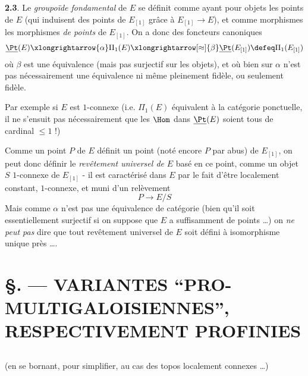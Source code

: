 {\bf 2.3}. Le \emph{groupoïde fondamental} de $E$ se définit comme ayant pour objets les points de $E$ (qui induisent des points de $E_{[1]}$ grâce à $E_{[1]} \to E$), et comme morphismes les morphismes \emph{de points} de $E_{[1]}$. On a donc des foncteurs canoniques
$$
\underline{\Pt}(E) \xlongrightarrow{\alpha} \Pi_1(E) \xlongrightarrow[\approx]{\beta} \underline{\Pt}(E_{[1]}) \defeq \Pi_1(E_{[1]})
$$
où $\beta$ est une équivalence (mais pas surjectif sur les objets), et où bien sur $\alpha$ n'est pas 
nécessairement une équivalence ni même pleinement fidèle, ou seulement fidèle.

Par exemple si $E$ est $1$-connexe (i.e. $\Pi_1(E)$ équivalent à la catégorie ponctuelle, il ne s'ensuit 
pas nécessairement que les $\Hom$ dans $\underline{\Pt}(E)$ soient tous de cardinal $\leq 1$ !)

Comme un point $P$ de $E$ définit un point (noté encore $P$ par abus) de $E_{[1]}$, on peut donc définir 
le \emph{revêtement universel de} $E$ basé en ce point, comme un objet $S$ $1$-connexe de $E_{[1]}$ - il 
est caractérisé dans $E$ par le fait d'être localement constant, $1$-connexe, et muni d'un relèvement
$$
P \to E/S
$$
Mais comme $\alpha$ n'est pas une équivalence de catégorie (bien qu'il soit essentiellement surjectif si 
on suppose que $E$ a suffisamment de points \dots) on \emph{ne peut pas} dire que tout revêtement universel 
de $E$ soit défini à isomorphisme unique près \dots.















\chapter*{\S {}. --- VARIANTES ``PRO-MULTIGALOISIENNES'', RESPECTIVEMENT PROFINIES}\thispagestyle{empty}
\label{sec:3}
\section*{}

(en se bornant, pour simplifier, au cas des topos localement connexes \dots)













